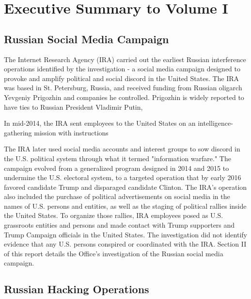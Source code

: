 \documentclass{article}
\begin{document}
\section{Executive Summary to Volume I}

\subsection{Russian Social Media Campaign}

The Internet Research Agency (IRA) carried out the earliest Russian interference operations identified by the investigation - a social media campaign designed to provoke and amplify political and social discord in the United States.
The IRA was based in St. Petersburg, Russia, and received funding from Russian oligarch Yevgeniy Prigozhin and companies he controlled.
Prigozhin is widely reported to have ties to Russian President Vladimir Putin, 

In mid-2014, the IRA sent employees to the United States on an intelligence-gathering mission with instructions 

The IRA later used social media accounts and interest groups to sow discord in the U.S. political system through what it termed "information warfare."
The campaign evolved from a generalized program designed in 2014 and 2015 to undermine the U.S. electoral system, to a targeted operation that by early 2016 favored candidate Trump and disparaged candidate Clinton.
The IRA's operation also included the purchase of political advertisements on social media in the names of U.S. persons and entities, as well as the staging of political rallies inside the United States.
To organize those rallies, IRA employees posed as U.S. grassroots entities and persons and made contact with Trump supporters and Trump Campaign officials in the United States.
The investigation did not identify evidence that any U.S. persons conspired or coordinated with the IRA.
Section II of this report details the Office's investigation of the Russian social media campaign.

\subsection{Russian Hacking Operations}
\end{document}
